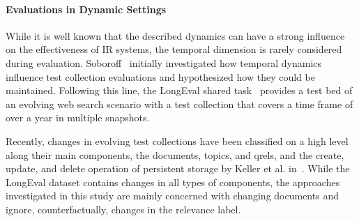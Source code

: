 \paragraph{Evaluations in Dynamic Settings}
While it is well known that the described dynamics can have a strong influence on the effectiveness of IR systems, the temporal dimension is rarely considered during evaluation. Soboroff~\cite{DBLP:conf/sigir/Soboroff06} initially investigated how temporal dynamics influence test collection evaluations and hypothesized how they could be maintained. Following this line, the LongEval shared task~\cite{DBLP:conf/clef/AlkhalifaBDEAFG24,DBLP:conf/clef/AlkhalifaBBCDEA23} provides a test bed of an evolving web search scenario with a test collection that covers a time frame of over a year in multiple snapshots.

Recently, changes in evolving test collections have been classified on a high level along their main components, the documents, topics, and qrels, and the create, update, and delete operation of persistent storage by Keller et al. in~\cite{keller:2024}. While the LongEval dataset contains changes in all types of components, the approaches investigated in this study are mainly concerned with changing documents and ignore, counterfactually, changes in the relevance label.
